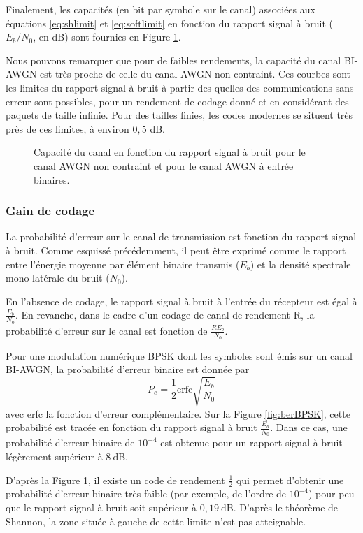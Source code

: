 Finalement, les capacités (en bit par symbole sur le canal) associées aux équations \ref{eq:shlimit} et \ref{eq:softlimit}
en fonction du rapport signal à bruit ($E_b/N_0$, en dB) sont fournies en Figure \ref{fig:capacity}.

Nous pouvons remarquer que pour de faibles rendements, la capacité du canal BI-AWGN est très proche de celle du canal 
AWGN non contraint. Ces courbes sont les limites du rapport signal à bruit à partir des quelles des communications sans 
erreur sont possibles, pour un rendement de codage donné et en considérant des paquets de taille infinie. Pour des 
tailles finies, les codes modernes se situent très près de ces limites, à environ $0,5$ dB.
\begin{figure}[!h]
	\centering
	
	\caption{\label{fig:capacity} Capacité du canal en fonction du rapport signal à bruit pour le canal AWGN non contraint 
	et pour le canal AWGN à entrée binaires.}
\end{figure}
\subsubsection{Gain de codage}
La probabilité d'erreur sur le canal de transmission est fonction du rapport signal à bruit. Comme esquissé précédemment, 
il peut être exprimé comme le rapport entre l'énergie moyenne par élément binaire transmis ($E_b$) et la densité 
spectrale mono-latérale du bruit ($N_0$).

En l'absence de codage, le rapport signal à bruit à l'entrée du récepteur est égal à $\frac{E_b}{N_0}$. En revanche, 
dans le cadre d'un codage de canal de rendement R, la probabilité d'erreur sur le canal est fonction de $\frac{RE_b}{N_0}$.

Pour une modulation numérique BPSK dont les symboles sont émis sur un canal BI-AWGN, la probabilité d'erreur binaire est
donnée par 
\begin{equation}
	P_e = \frac{1}{2} \text{erfc}\sqrt{\frac{E_b}{N_0}}
\end{equation}
avec erfc la fonction d'erreur complémentaire.
Sur la Figure \ref{fig:berBPSK}, cette probabilité est tracée en fonction du rapport signal à bruit $\frac{E_b}{N_0}$.
Dans ce cas, une probabilité d'erreur binaire de $10^{-4}$ est obtenue pour un rapport signal à bruit légèrement 
supérieur à $8~\text{dB}$. 

D'après la Figure \ref{fig:capacity}, il existe un code de rendement $\frac{1}{2}$ qui permet d'obtenir une probabilité 
d'erreur binaire très faible (par exemple, de l'ordre de $10^{-4}$) pour peu que le rapport signal à bruit soit supérieur 
à $0,19~\text{dB}$. D'après le théorème de Shannon, la zone située à gauche de cette limite n'est pas atteignable.

